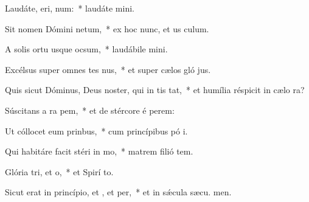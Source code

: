 \item Laudáte, eri, num:~* laudáte  mini.
\item Sit nomen Dómini netum,~* ex hoc nunc, et us  culum.
\item A solis ortu usque  ocsum,~* laudábile  mini.
\item Excélsus super omnes tes nus,~* et super cælos gló jus.
\item Quis sicut Dóminus, Deus noster, qui in tis tat,~* et humília réspicit in cælo   ra?
\item Súscitans a ra pem,~* et de stércore é perem:
\item Ut cóllocet eum  prinbus,~* cum princípibus pó i.
\item Qui habitáre facit stéri in mo,~* matrem filió tem.
\item Glória tri, et o,~* et Spirí to.
\item Sicut erat in princípio, et , et per,~* et in sǽcula sæcu. men.
